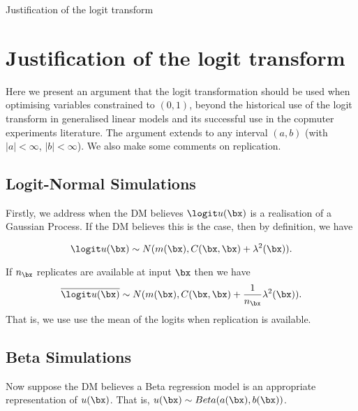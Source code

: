 \begin{chapter}{Justification of the logit transform}
\section{Justification of the logit transform}
Here we present an argument that the logit transformation should be used when optimising variables constrained to $(0,1)$, beyond the historical use of the logit transform in generalised linear models and its successful use in the copmuter experiments literature. The argument extends to any interval $(a, b)$ (with $|a| < \infty$, $|b| < \infty$). We also make some comments on replication.

\subsection{Logit-Normal Simulations}

Firstly, we address when the DM believes $\logit u(\bx)$ is a realisation of a Gaussian Process. If the DM believes this is the case, then by definition, we have

\begin{equation}
    \logit u(\bx) \sim N( m(\bx), C(\bx, \bx) + \lambda^2 (\bx)).
\end{equation}

If $n_{\bx}$ replicates are available at input $\bx$ then we have
\begin{equation}
    \overline{\logit u(\bx)} \sim N( m(\bx), C(\bx, \bx) + \frac{1}{n_{\bx}}\lambda^2 (\bx)).
\end{equation}
That is, we use use the mean of the logits when replication is available.

\subsection{Beta Simulations}

Now suppose the DM believes a Beta regression model is an appropriate representation of $u(\bx)$. That is, $u(\bx) \sim Beta( a(\bx), b(\bx))$.


\end{chapter}
